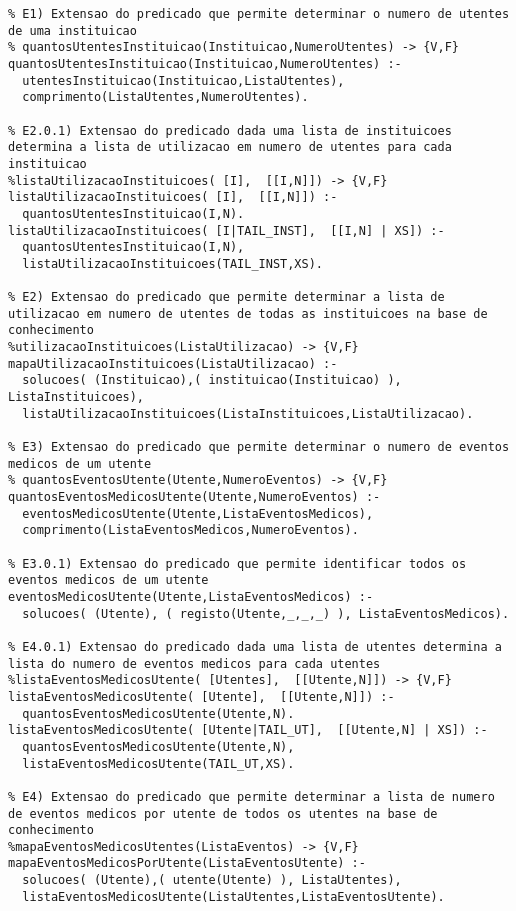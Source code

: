 \documentclass[
  oneside,
  10pt, a4paper,
  footinclude=true,
  headinclude=true,
  cleardoublepage=empty
]{scrbook}
\begin{document}
	\begin{lstlisting}
% E1) Extensao do predicado que permite determinar o numero de utentes de uma instituicao 
% quantosUtentesInstituicao(Instituicao,NumeroUtentes) -> {V,F}
quantosUtentesInstituicao(Instituicao,NumeroUtentes) :- 
  utentesInstituicao(Instituicao,ListaUtentes),
  comprimento(ListaUtentes,NumeroUtentes).

% E2.0.1) Extensao do predicado dada uma lista de instituicoes determina a lista de utilizacao em numero de utentes para cada instituicao 
%listaUtilizacaoInstituicoes( [I],  [[I,N]]) -> {V,F}
listaUtilizacaoInstituicoes( [I],  [[I,N]]) :- 
  quantosUtentesInstituicao(I,N).
listaUtilizacaoInstituicoes( [I|TAIL_INST],  [[I,N] | XS]) :- 
  quantosUtentesInstituicao(I,N),
  listaUtilizacaoInstituicoes(TAIL_INST,XS).

% E2) Extensao do predicado que permite determinar a lista de utilizacao em numero de utentes de todas as instituicoes na base de conhecimento 
%utilizacaoInstituicoes(ListaUtilizacao) -> {V,F} 
mapaUtilizacaoInstituicoes(ListaUtilizacao) :- 
  solucoes( (Instituicao),( instituicao(Instituicao) ), ListaInstituicoes),
  listaUtilizacaoInstituicoes(ListaInstituicoes,ListaUtilizacao).

% E3) Extensao do predicado que permite determinar o numero de eventos medicos de um utente 
% quantosEventosUtente(Utente,NumeroEventos) -> {V,F}
quantosEventosMedicosUtente(Utente,NumeroEventos) :-
  eventosMedicosUtente(Utente,ListaEventosMedicos),
  comprimento(ListaEventosMedicos,NumeroEventos).

% E3.0.1) Extensao do predicado que permite identificar todos os eventos medicos de um utente 
eventosMedicosUtente(Utente,ListaEventosMedicos) :-
  solucoes( (Utente), ( registo(Utente,_,_,_) ), ListaEventosMedicos).

% E4.0.1) Extensao do predicado dada uma lista de utentes determina a lista do numero de eventos medicos para cada utentes 
%listaEventosMedicosUtente( [Utentes],  [[Utente,N]]) -> {V,F}
listaEventosMedicosUtente( [Utente],  [[Utente,N]]) :- 
  quantosEventosMedicosUtente(Utente,N).
listaEventosMedicosUtente( [Utente|TAIL_UT],  [[Utente,N] | XS]) :- 
  quantosEventosMedicosUtente(Utente,N),
  listaEventosMedicosUtente(TAIL_UT,XS).

% E4) Extensao do predicado que permite determinar a lista de numero de eventos medicos por utente de todos os utentes na base de conhecimento 
%mapaEventosMedicosUtentes(ListaEventos) -> {V,F} 
mapaEventosMedicosPorUtente(ListaEventosUtente) :- 
  solucoes( (Utente),( utente(Utente) ), ListaUtentes),
  listaEventosMedicosUtente(ListaUtentes,ListaEventosUtente).


\end{lstlisting}
\end{document}
